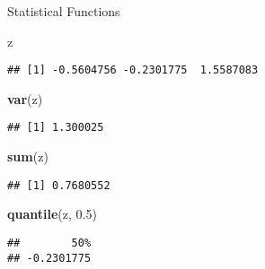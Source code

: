 \documentclass[ignorenonframetext,]{beamer}
\newenvironment{Shaded}{\begin{snugshade}}{\end{snugshade}}
\newcommand{\FloatTok}[1]{\textcolor[rgb]{0.00,0.00,0.81}{#1}}
\newcommand{\KeywordTok}[1]{\textcolor[rgb]{0.13,0.29,0.53}{\textbf{#1}}}
\newcommand{\NormalTok}[1]{#1}
\begin{document}
\begin{frame}[fragile]{Statistical Functions}
\protect\hypertarget{statistical-functions-2}{}

\begin{Shaded}
\begin{Highlighting}[]
\NormalTok{z}
\end{Highlighting}
\end{Shaded}

\begin{verbatim}
## [1] -0.5604756 -0.2301775  1.5587083
\end{verbatim}

\begin{Shaded}
\begin{Highlighting}[]
\KeywordTok{var}\NormalTok{(z)}
\end{Highlighting}
\end{Shaded}

\begin{verbatim}
## [1] 1.300025
\end{verbatim}

\begin{Shaded}
\begin{Highlighting}[]
\KeywordTok{sum}\NormalTok{(z)}
\end{Highlighting}
\end{Shaded}

\begin{verbatim}
## [1] 0.7680552
\end{verbatim}

\begin{Shaded}
\begin{Highlighting}[]
\KeywordTok{quantile}\NormalTok{(z, }\FloatTok{0.5}\NormalTok{)}
\end{Highlighting}
\end{Shaded}

\begin{verbatim}
##        50% 
## -0.2301775
\end{verbatim}

\end{frame}
\end{document}
